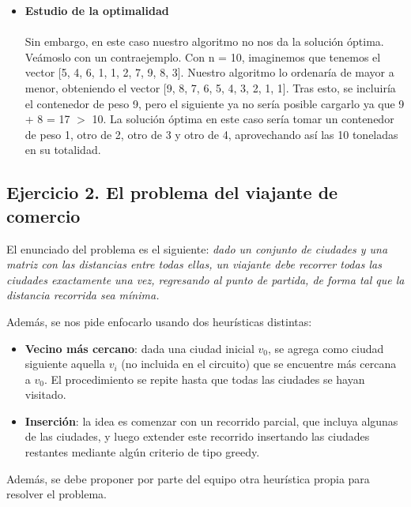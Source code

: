 \documentclass[10pt,a4paper]{article}
\begin{document}
	
	
	\begin{itemize}
		\item \textbf{Estudio de la optimalidad}
		\\
		\\
		Sin embargo, en este caso nuestro algoritmo no nos da la solución óptima. Veámoslo con un contraejemplo. Con n = 10, imaginemos que tenemos el vector [5, 4, 6, 1, 1, 2, 7, 9, 8, 3].
		Nuestro algoritmo lo ordenaría de mayor a menor, obteniendo el vector [9, 8, 7, 6, 5, 4, 3, 2, 1, 1]. Tras esto, se incluiría el contenedor de peso 9, pero el siguiente ya no sería posible cargarlo ya que 9 + 8 = 17 $>$ 10. La solución óptima en este caso sería tomar un contenedor de peso 1, otro de 2, otro de 3 y otro de 4, aprovechando así las 10 toneladas en su totalidad.
	\end{itemize}
	
\subsection{Ejercicio 2. El problema del viajante de comercio}

El enunciado del problema es el siguiente: \textit{dado un conjunto de ciudades y una matriz con las distancias entre todas ellas, un viajante debe recorrer todas las ciudades exactamente una vez, regresando al punto de partida, de forma tal que la distancia recorrida sea mínima.}

Además, se nos pide enfocarlo usando dos heurísticas distintas:
\begin{itemize}
	\item \textbf{Vecino más cercano}: dada una ciudad inicial \(v_0\), se agrega como ciudad siguiente aquella \(v_i\) (no incluida en el circuito) que se encuentre más cercana a \(v_0\). El procedimiento se repite hasta que todas las ciudades se hayan visitado.
	\item \textbf{Inserción}: la idea es comenzar con un recorrido parcial, que incluya algunas de las ciudades, y luego extender este recorrido insertando las ciudades restantes mediante algún criterio de tipo greedy.
\end{itemize}

Además, se debe proponer por parte del equipo otra heurística propia para resolver el problema.
\end{document}
